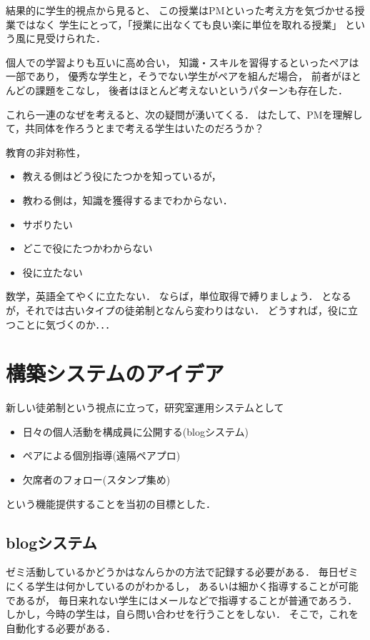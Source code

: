 \documentclass{hissymp}
\begin{document}
結果的に学生的視点から見ると、
この授業はPMといった考え方を気づかせる授業ではなく
学生にとって，「授業に出なくても良い楽に単位を取れる授業」
という風に見受けられた．

個人での学習よりも互いに高め合い，
知識・スキルを習得するといったペアは一部であり，
優秀な学生と，そうでない学生がペアを組んだ場合，
前者がほとんどの課題をこなし，
後者はほとんど考えないというパターンも存在した．

これら一連のなぜを考えると、次の疑問が湧いてくる．
はたして、PMを理解して，共同体を作ろうとまで考える学生はいたのだろうか？

教育の非対称性，
\begin{itemize}
\item 教える側はどう役にたつかを知っているが，
\item 教わる側は，知識を獲得するまでわからない．

\item サボりたい
\item どこで役にたつかわからない
\item 役に立たない
\end{itemize}
数学，英語全てやくに立たない．
ならば，単位取得で縛りましょう．
となるが，それでは古いタイプの徒弟制となんら変わりはない．
どうすれば，役に立つことに気づくのか．．．

\section{構築システムのアイデア}
\label{sec:org9e263ff}
新しい徒弟制という視点に立って，研究室運用システムとして
\begin{itemize}
\item 日々の個人活動を構成員に公開する(blogシステム)
\item ペアによる個別指導(遠隔ペアプロ)
\item 欠席者のフォロー(スタンプ集め)
\end{itemize}
という機能提供することを当初の目標とした．

\subsection{blogシステム}
\label{sec:org586d200}
ゼミ活動しているかどうかはなんらかの方法で記録する必要がある．
毎日ゼミにくる学生は何かしているのがわかるし，
あるいは細かく指導することが可能であるが，
毎日来れない学生にはメールなどで指導することが普通であろう．
しかし，今時の学生は，自ら問い合わせを行うことをしない．
そこで，これを自動化する必要がある．
\end{document}
